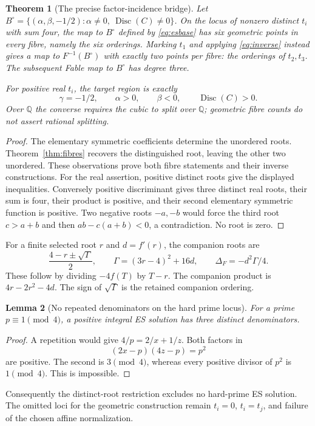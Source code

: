 \documentclass[11pt]{article}
\newtheorem{theorem}{Theorem}[section]
\newtheorem{lemma}[theorem]{Lemma}
\theoremstyle{remark}\newtheorem{remark}[theorem]{Remark}
\newcommand{\Q}{\mathbb Q}\newcommand{\C}{\mathbb C}\newcommand{\Z}{\mathbb Z}
\newcommand{\Disc}{\operatorname{Disc}}\newcommand{\tr}{\operatorname{tr}}
\begin{document}
\begin{theorem}[The precise factor-incidence bridge]\label{thm:esbridge}
Let $B^\circ=\{(\alpha,\beta,-1/2):\alpha\ne0,\ \Disc(C)\ne0\}$. On the locus of nonzero distinct $t_i$ with sum four, the map to $B^\circ$ defined by \eqref{eq:esbase} has six geometric points in every fibre, namely the six orderings. Marking $t_1$ and applying \eqref{eq:inverse} instead gives a map to $F^{-1}(B^\circ)$ with exactly two points per fibre: the orderings of $t_2,t_3$. The subsequent Fable map to $B^\circ$ has degree three.

For positive real $t_i$, the target region is exactly
\[
 \gamma=-1/2,\qquad\alpha>0,\qquad\beta<0,\qquad\Disc(C)>0.
\]
Over $\Q$ the converse requires the cubic to split over $\Q$; geometric fibre counts do not assert rational splitting.
\end{theorem}
\begin{proof}
The elementary symmetric coefficients determine the unordered roots. Theorem~\ref{thm:fibres} recovers the distinguished root, leaving the other two unordered. These observations prove both fibre statements and their inverse constructions. For the real assertion, positive distinct roots give the displayed inequalities. Conversely positive discriminant gives three distinct real roots, their sum is four, their product is positive, and their second elementary symmetric function is positive. Two negative roots $-a,-b$ would force the third root $c>a+b$ and then $ab-c(a+b)<0$, a contradiction. No root is zero.
\end{proof}
For a finite selected root $r$ and $d=f'(r)$, the companion roots are
\begin{equation}\label{eq:companion}
 \frac{4-r\pm\sqrt{\Gamma}}2,\qquad
 \Gamma=(3r-4)^2+16d,
 \qquad \Delta_F=-d^2\Gamma/4.
\end{equation}
These follow by dividing $-4f(T)$ by $T-r$. The companion product is $4r-2r^2-4d$. The sign of $\sqrt\Gamma$ is the retained companion ordering.

\begin{lemma}[No repeated denominators on the hard prime locus]
For a prime $p\equiv1\pmod4$, a positive integral ES solution has three distinct denominators.
\end{lemma}
\begin{proof}
A repetition would give $4/p=2/x+1/z$. Both factors in
\[
 (2x-p)(4z-p)=p^2
\]
are positive. The second is $3\pmod4$, whereas every positive divisor of $p^2$ is $1\pmod4$. This is impossible.
\end{proof}
Consequently the distinct-root restriction excludes no hard-prime ES solution. The omitted loci for the geometric construction remain $t_i=0$, $t_i=t_j$, and failure of the chosen affine normalization.
\end{document}
